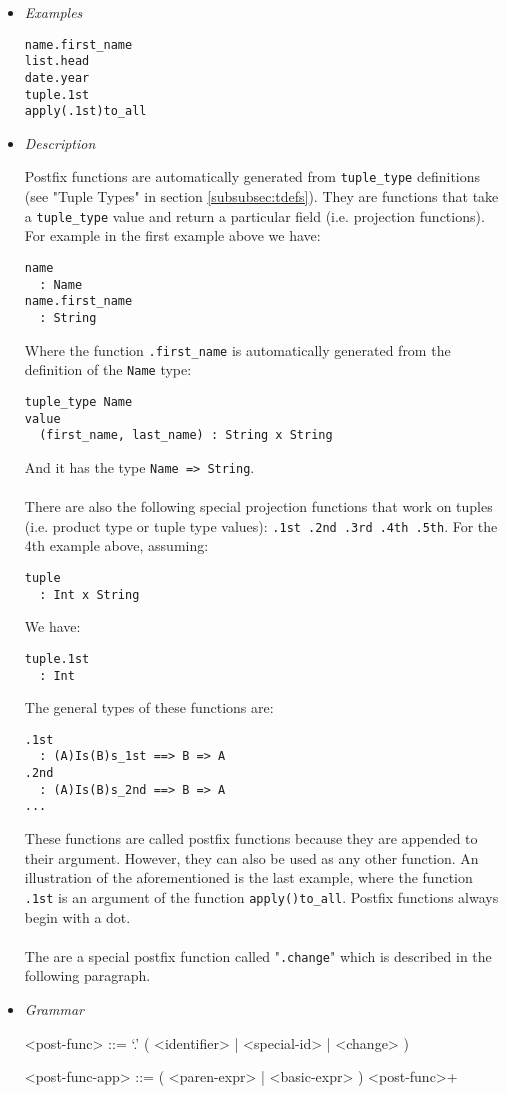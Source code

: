 \documentclass{article}
\begin{document}
\begin{itemize}

\item \textit{Examples}
\begin{verbatim}
name.first_name
list.head
date.year
tuple.1st
apply(.1st)to_all
\end{verbatim}

\item \textit{Description} 

Postfix functions are automatically generated from \texttt{tuple_type}
definitions (see "Tuple Types" in section \ref{subsubsec:tdefs}). They are
functions that take a \texttt{tuple_type} value and return a particular field
(i.e. projection functions). For example in the first example above we have:
\begin{verbatim}
name 
  : Name
name.first_name
  : String
\end{verbatim}
Where the function \texttt{.first_name} is automatically generated from the
definition of the \texttt{Name} type:
\begin{verbatim}
tuple_type Name
value
  (first_name, last_name) : String x String
\end{verbatim}
And it has the type \texttt{Name => String}.
\\\\
There are also the following special projection functions that work on tuples
(i.e. product type or tuple type values): \texttt{.1st .2nd .3rd .4th .5th}.
For the 4th example above, assuming:
\begin{verbatim}
tuple 
  : Int x String
\end{verbatim}
We have:
\begin{verbatim}
tuple.1st
  : Int
\end{verbatim}
The general types of these functions are:
\begin{verbatim}
.1st
  : (A)Is(B)s_1st ==> B => A
.2nd
  : (A)Is(B)s_2nd ==> B => A
...
\end{verbatim}
These functions are called postfix functions because they are appended to
their argument. However, they can also be used as any other function.
An illustration of the aforementioned is the last example, where the function
\texttt{.1st} is an argument of the function \texttt{apply()to_all}.
Postfix functions always begin with a dot.
\\\\
The are a special postfix function called "\texttt{.change}" which is described in
the following paragraph.

\item \textit{Grammar}
\begin{grammar}
<post-func> ::= `.' ( <identifier> | <special-id> | <change> )

<post-func-app> ::= ( <paren-expr> | <basic-expr> ) <post-func>+
\end{grammar}

\end{itemize}
\end{document}
